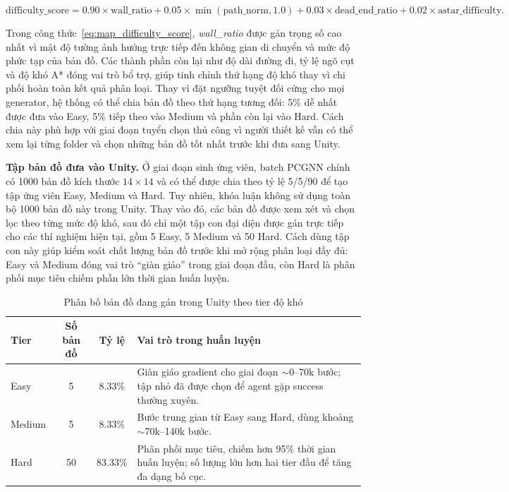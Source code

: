 \begin{equation}
    \text{difficulty\_score}
    = 0.90 \times \text{wall\_ratio}
    + 0.05 \times \min(\text{path\_norm}, 1.0)
    + 0.03 \times \text{dead\_end\_ratio}
    + 0.02 \times \text{astar\_difficulty}.
    \label{eq:map_difficulty_score}
\end{equation}

Trong công thức~\ref{eq:map_difficulty_score}, \emph{wall\_ratio} được gán trọng số cao nhất vì mật độ tường ảnh hưởng trực tiếp đến không gian di chuyển và mức độ phức tạp của bản đồ. Các thành phần còn lại như độ dài đường đi, tỷ lệ ngõ cụt và độ khó A* đóng vai trò bổ trợ, giúp tinh chỉnh thứ hạng độ khó thay vì chi phối hoàn toàn kết quả phân loại. Thay vì đặt ngưỡng tuyệt đối cứng cho mọi generator, hệ thống có thể chia bản đồ theo thứ hạng tương đối: 5\% dễ nhất được đưa vào Easy, 5\% tiếp theo vào Medium và phần còn lại vào Hard. Cách chia này phù hợp với giai đoạn tuyển chọn thủ công vì người thiết kế vẫn có thể xem lại từng folder và chọn những bản đồ tốt nhất trước khi đưa sang Unity.

\textbf{Tập bản đồ đưa vào Unity.} Ở giai đoạn sinh ứng viên, batch PCGNN chính có 1000 bản đồ kích thước $14\times14$ và có thể được chia theo tỷ lệ 5/5/90 để tạo tập ứng viên Easy, Medium và Hard. Tuy nhiên, khóa luận không sử dụng toàn bộ 1000 bản đồ này trong Unity. Thay vào đó, các bản đồ được xem xét và chọn lọc theo từng mức độ khó, sau đó chỉ một tập con đại diện được gán trực tiếp cho các thí nghiệm hiện tại, gồm 5 Easy, 5 Medium và 50 Hard. Cách dùng tập con này giúp kiểm soát chất lượng bản đồ trước khi mở rộng phân loại đầy đủ: Easy và Medium đóng vai trò ``giàn giáo'' trong giai đoạn đầu, còn Hard là phân phối mục tiêu chiếm phần lớn thời gian huấn luyện.

\begin{table}[H]
    \centering
    \small
    \caption{Phân bố bản đồ đang gán trong Unity theo tier độ khó}
    \label{tab:map_split}
    \begin{tabular}{|p{2.5cm}|c|c|p{7.5cm}|}
        \hline
        \textbf{Tier} & \textbf{Số bản đồ} & \textbf{Tỷ lệ} & \textbf{Vai trò trong huấn luyện} \\
        \hline
        Easy   & 5  & 8.33\%  & Giàn giáo gradient cho giai đoạn $\sim$0--70k bước; tập nhỏ đã được chọn để agent gặp success thường xuyên. \\
        \hline
        Medium & 5  & 8.33\%  & Bước trung gian từ Easy sang Hard, dùng khoảng $\sim$70k--140k bước. \\
        \hline
        Hard   & 50 & 83.33\% & Phân phối mục tiêu, chiếm hơn 95\% thời gian huấn luyện; số lượng lớn hơn hai tier đầu để tăng đa dạng bố cục. \\
        \hline
    \end{tabular}
\end{table}

